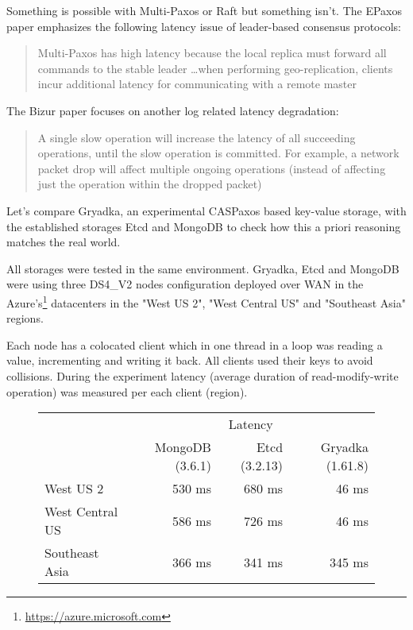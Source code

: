 \documentclass[12pt]{article}
\theoremstyle{definition}
\begin{document}
Something is possible with Multi-Paxos or Raft but something isn't. The EPaxos paper emphasizes the following latency issue of leader-based consensus protocols:

\begin{quote}
Multi-Paxos has high latency because the local replica must forward all commands to the stable leader \ldots when performing geo-replication, clients incur additional latency for communicating with a remote master
\end{quote}

The Bizur paper\cite{bizur} focuses on another log related latency degradation:

\begin{quote}
A single slow operation will increase the latency of all succeeding operations, until the slow operation is committed. For example, a network packet drop will affect multiple ongoing operations (instead of affecting just the operation within the dropped packet)
\end{quote}

Let's compare Gryadka, an experimental CASPaxos based key-value storage, with the established storages Etcd and MongoDB to check how this a priori reasoning matches the real world.

All storages were tested in the same environment. Gryadka, Etcd and MongoDB were using three DS4\_V2 nodes configuration deployed over WAN in the Azure's\footnote{\href{https://azure.microsoft.com}{https://azure.microsoft.com}} datacenters in the "West US 2", "West Central US" and "Southeast Asia" regions.

Each node has a colocated client which in one thread in a loop was reading a value, incrementing and writing it back. All clients used their keys to avoid collisions. During the experiment latency (average duration of read-modify-write operation) was measured per each client (region).

\begin{figure}[!htb]
  \centering
  \begin{tabular}{c|r|r|r|}
  \cline{2-4}
  & \multicolumn{3}{|c|}{Latency} \\
  \cline{2-4}
  & MongoDB (3.6.1) & Etcd (3.2.13) & Gryadka (1.61.8) \\
  \hline
  \multicolumn{1}{|l|}{West US 2} & 530 ms & 680 ms & 46 ms \\
  \hline
  \multicolumn{1}{|l|}{West Central US} & 586 ms & 726 ms & 46 ms \\
  \hline
  \multicolumn{1}{|l|}{Southeast Asia} & 366 ms & 341 ms & 345 ms \\
  \hline
  \end{tabular}
\end{figure}
\end{document}
